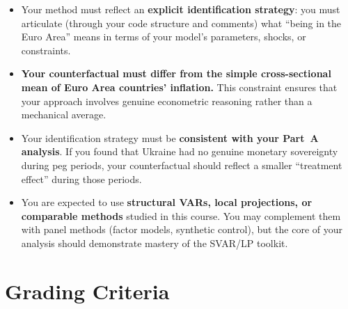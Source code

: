 \documentclass[11pt,a4paper]{article}
\begin{document}
\begin{itemize}[leftmargin=2em]

  \item Your method must reflect an \textbf{explicit identification strategy}:
  you must articulate (through your code structure and comments) what ``being in
  the Euro Area'' means in terms of your model's parameters, shocks, or
  constraints.

  \item \textbf{Your counterfactual must differ from the simple cross-sectional
  mean of Euro Area countries' inflation.} This constraint ensures that your
  approach involves genuine econometric reasoning rather than a mechanical
  average.

  \item Your identification strategy must be \textbf{consistent with your
  Part~A analysis}. If you found that Ukraine had no genuine monetary
  sovereignty during peg periods, your counterfactual should reflect a smaller
  ``treatment effect'' during those periods.

  \item You are expected to use \textbf{structural VARs, local projections, or
  comparable methods} studied in this course. You may complement them with panel
  methods (factor models, synthetic control), but the core of your analysis
  should demonstrate mastery of the SVAR/LP toolkit.

\end{itemize}


\section*{Grading Criteria}
\end{document}
